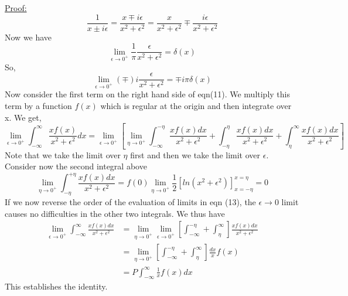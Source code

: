 \underline{Proof:}
\begin{equation}
\frac{1}{x \pm i\epsilon} = \frac{x \mp i\epsilon}{x^2+\epsilon^2} = \frac{x}{x^2+\epsilon^2} \mp \frac{i\epsilon}{x^2 + \epsilon^2}
\end{equation}
Now we have $$\lim_{\epsilon \to 0^+} \frac{1}{\pi} \frac{\epsilon}{x^2+\epsilon^2} = \delta(x)$$
So, 
\begin{equation}
\lim_{\epsilon \to 0^+} (\mp)i  \frac{\epsilon}{x^2+\epsilon^2} = \mp i\pi \delta(x)
\end{equation}
Now consider the first term on the right hand side of eqn(11). We multiply this term by a function $f(x)$ which is regular at the origin and then integrate over x. We get,
\begin{equation}
\lim_{\epsilon \to 0^+} \int_{-\infty}^{\infty} \frac{x f(x)}{x^2 + \epsilon^2} dx = \lim_{\epsilon \to 0^+} \left[ \lim_{\eta \to 0^+} \int_{-\infty}^{-\eta} \frac{xf(x)dx}{x^2+\epsilon^2} + \int_{-\eta}^{\eta} \frac{xf(x)dx}{x^2+\epsilon^2} + \int_{\eta}^{\infty} \frac{xf(x)dx}{x^2+\epsilon^2} \right]
\end{equation}
Note that we take the limit over $\eta$ first and then we take the limit over $\epsilon$. Consider now the second integral above $$\lim_{\eta \to 0^+ } \int_{-\eta}^{+\eta} \frac{xf(x)dx}{x^2 + \epsilon^2} = f(0) \lim_{\eta \to 0^+} \frac{1}{2} [ln(x^2+\epsilon^2)]_{x=-\eta}^{x=\eta} = 0$$
If we now reverse the order of the evaluation of limits in eqn (13), the $\epsilon \to 0$ limit causes no difficulties in the other two integrals. We thus have
\begin{align*}
\lim_{\epsilon \to 0^+} \int_{-\infty}^{\infty} \frac{xf(x)dx}{x^2 + \epsilon^2} & = \lim_{\eta \to 0^+} \lim_{\epsilon \to 0^+} \left[ \int_{-\infty}^{-\eta} + \int_{\eta}^{\infty} \right] \frac{xf(x)dx}{x^2 + \epsilon^2} \\
&= \lim_{\eta \to 0^+} \left[ \int_{-\infty}^{-\eta} + \int_{\eta}^{\infty} \right] \frac{dx}{x} f(x) \\
&= P \int_{-\infty}^{\infty} \frac{1}{x} f(x) dx
\end{align*}
This establishes the identity.

